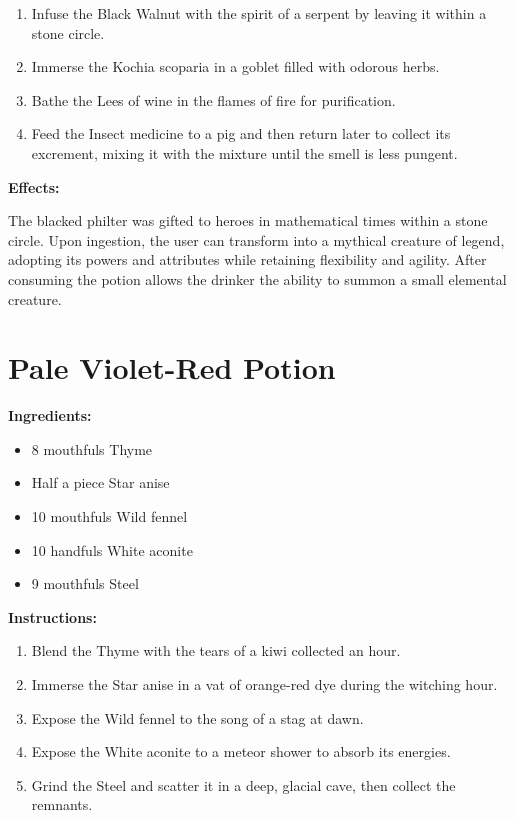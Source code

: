\documentclass{article}
\begin{document}
\begin{enumerate}
  \item Infuse the Black Walnut with the spirit of a serpent by leaving it within a stone circle.
  \item Immerse the Kochia scoparia in a goblet filled with odorous herbs.
  \item Bathe the Lees of wine in the flames of fire for purification.
  \item Feed the Insect medicine to a pig and then return later to collect its excrement, mixing it with the mixture until the smell is less pungent.
\end{enumerate}

\textbf{Effects:}

The blacked philter was gifted to heroes in mathematical times within a stone circle. Upon ingestion, the user can transform into a mythical creature of legend, adopting its powers and attributes while retaining flexibility and agility. After consuming the potion allows the drinker the ability to summon a small elemental creature.

\newpage
\section*{Pale Violet-Red Potion}

\textbf{Ingredients:}

\begin{itemize}
  \item 8 mouthfuls Thyme
  \item Half a piece Star anise
  \item 10 mouthfuls Wild fennel
  \item 10 handfuls White aconite
  \item 9 mouthfuls Steel
\end{itemize}

\textbf{Instructions:}

\begin{enumerate}
  \item Blend the Thyme with the tears of a kiwi collected an hour.
  \item Immerse the Star anise in a vat of orange-red dye during the witching hour.
  \item Expose the Wild fennel to the song of a stag at dawn.
  \item Expose the White aconite to a meteor shower to absorb its energies.
  \item Grind the Steel and scatter it in a deep, glacial cave, then collect the remnants.
\end{enumerate}
\end{document}

